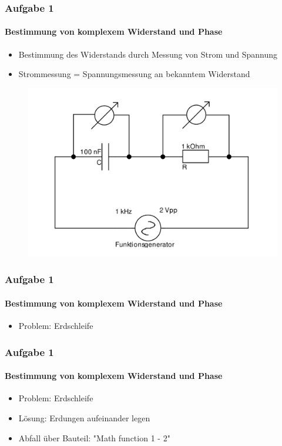 \begin{frame}
\frametitle{Aufgabe 1}
\framesubtitle{Bestimmung von komplexem Widerstand und Phase}
    \begin{itemize}
        \item Bestimmung des Widerstands durch Messung von Strom und Spannung
        \item Strommessung = Spannungsmessung an bekanntem Widerstand
    \end{itemize}    
    \begin{figure}[H]
    \begin{center}
            \includegraphics[scale=0.15]{./img/schaltbild_1_ohne_erdung.png}
    \end{center}
    \end{figure}
\end{frame}
\begin{frame}
\frametitle{Aufgabe 1}
\framesubtitle{Bestimmung von komplexem Widerstand und Phase}
    \begin{itemize}
        \item Problem: Erdschleife
    \end{itemize}
\end{frame}
\begin{frame}
\frametitle{Aufgabe 1}
\framesubtitle{Bestimmung von komplexem Widerstand und Phase}
    \begin{itemize}
        \item Problem: Erdschleife
        \item Lösung: Erdungen aufeinander legen
        \item Abfall über Bauteil: "Math function 1 - 2"
    \end{itemize}
\end{frame}


